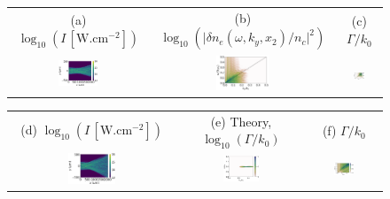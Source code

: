 \documentclass[
 reprint,
 superscriptaddress,
 amsmath,amssymb,
 aps,
]{revtex4-1}
\begin{document}
\begin{figure}
\begin{tabular}{ccc}
(a) $\log_{10}(I \,[\mathrm{W.cm^{-2}}] )$&
(b) $\log_{10}(\vert\delta n_e(\omega,k_y,x_2)/n_c\vert^2)$ &
(c) $\Gamma/k_0$\\ 
\includegraphics[width=0.3\textwidth]{Fig7a.eps}
&\includegraphics[width=0.3\textwidth]{Fig7b.eps}
&\includegraphics[width=0.3\textwidth]{Fig7c.eps}
\end{tabular}
\begin{tabular}{ccc}
(d) $\log_{10}(I \,[\mathrm{W.cm^{-2}}] )$&
(e) Theory, $\log_{10}(\Gamma/k_0)$ &
(f) $\Gamma/k_0$\\ 
\includegraphics[width=0.3\textwidth]{Fig7d.eps}
&\includegraphics[width=0.3\textwidth]{Fig7e.eps}
&\includegraphics[width=0.3\textwidth]{Fig7f.eps}

\end{tabular}
\end{figure}
\end{document}
